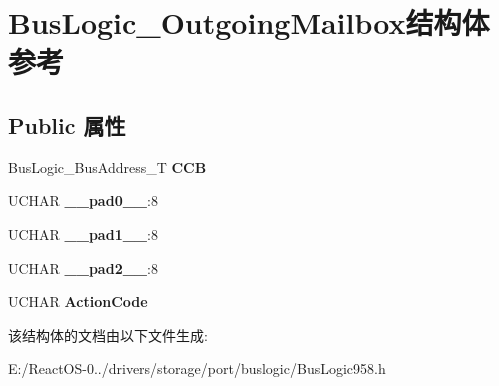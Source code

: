 \hypertarget{struct_bus_logic___outgoing_mailbox}{}\section{Bus\+Logic\+\_\+\+Outgoing\+Mailbox结构体 参考}
\label{struct_bus_logic___outgoing_mailbox}
\subsection*{Public 属性}
\begin{DoxyCompactItemize}
\item 
\mbox{\label{struct_bus_logic___outgoing_mailbox_af5f5ae29818958e2897da999a64ee8f6}} 
Bus\+Logic\+\_\+\+Bus\+Address\+\_\+T {\bfseries C\+CB}
\item 
\mbox{\label{struct_bus_logic___outgoing_mailbox_ab1d1dababa2389d4c76f999d6a155c0f}} 
U\+C\+H\+AR {\bfseries \+\_\+\+\_\+pad0\+\_\+\+\_\+}\+:8
\item 
\mbox{\label{struct_bus_logic___outgoing_mailbox_a8ddc2fc7fe5c6f70c1ece67fce7352d4}} 
U\+C\+H\+AR {\bfseries \+\_\+\+\_\+pad1\+\_\+\+\_\+}\+:8
\item 
\mbox{\label{struct_bus_logic___outgoing_mailbox_a7d2e774c65ed8c573d1a6c92cf06d899}} 
U\+C\+H\+AR {\bfseries \+\_\+\+\_\+pad2\+\_\+\+\_\+}\+:8
\item 
\mbox{\label{struct_bus_logic___outgoing_mailbox_a810e0795020c7cc7fc5fb0b5326485f1}} 
U\+C\+H\+AR {\bfseries Action\+Code}
\end{DoxyCompactItemize}


该结构体的文档由以下文件生成\+:\begin{DoxyCompactItemize}
\item 
E\+:/\+React\+O\+S-\/0../drivers/storage/port/buslogic/Bus\+Logic958.\+h\end{DoxyCompactItemize}
